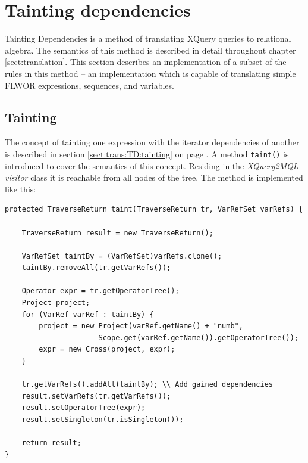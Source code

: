 \section{Tainting dependencies}
\label{sect:impl:tainting_deps}
Tainting Dependencies is a method of translating XQuery queries to
relational algebra. The semantics of this method is described in detail
throughout chapter \ref{sect:translation}. This section
describes an implementation of a subset of the rules in this method -- an
implementation which is capable of translating simple FLWOR expressions,
sequences, and variables.

\subsection{Tainting}
\label{sect:impl:taint:taint}
The concept of tainting one expression with the iterator dependencies of another is described in section
\ref{sect:trans:TD:tainting} on page \pageref{sect:trans:TD:tainting}. A method
\texttt{taint()} is introduced to cover the semantics of this concept.
Residing in the \textit{XQuery2MQL visitor} class it is reachable from all nodes of the tree. The method is implemented like this:

\begin{Verbatim}
protected TraverseReturn taint(TraverseReturn tr, VarRefSet varRefs) {
        
    TraverseReturn result = new TraverseReturn();
        
    VarRefSet taintBy = (VarRefSet)varRefs.clone();
    taintBy.removeAll(tr.getVarRefs());
        
    Operator expr = tr.getOperatorTree();
    Project project;
    for (VarRef varRef : taintBy) {
        project = new Project(varRef.getName() + "numb",
                      Scope.get(varRef.getName()).getOperatorTree());
        expr = new Cross(project, expr);
    }

    tr.getVarRefs().addAll(taintBy); \\ Add gained dependencies
    result.setVarRefs(tr.getVarRefs());
    result.setOperatorTree(expr);
    result.setSingleton(tr.isSingleton());
        
    return result;
}
\end{Verbatim}

